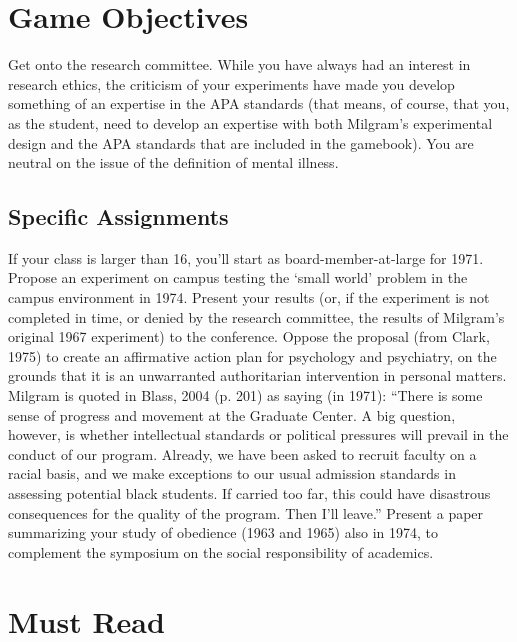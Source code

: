 \section{Game Objectives}
\label{gameobjectives}

Get onto the research committee. While you have always had an interest in research ethics, the criticism of your experiments have made you develop something of an expertise in the APA standards (that means, of course, that you, as the student, need to develop an expertise with both Milgram's experimental design and the APA standards that are included in the gamebook).
You are neutral on the issue of the definition of mental illness.

\subsection{Specific Assignments}
\label{specificassignments}

If your class is larger than 16, you'll start as board-member-at-large for 1971.
Propose an experiment on campus testing the `small world' problem in the campus environment in 1974. Present your results (or, if the experiment is not completed in time, or denied by the research committee, the results of Milgram's original 1967 experiment) to the conference.
Oppose the proposal (from Clark, 1975) to create an affirmative action plan for psychology and psychiatry, on the grounds that it is an unwarranted authoritarian intervention in personal matters. Milgram is quoted in Blass, 2004 (p. 201) as saying (in 1971):
 “There is some sense of progress and movement at the Graduate Center. A big question, however, is whether intellectual standards or political pressures will prevail in the conduct of our program. Already, we have been asked to recruit faculty on a racial basis, and we make exceptions to our usual admission standards in assessing potential black students. If carried too far, this could have disastrous consequences for the quality of the program. Then I'll leave.”
Present a paper summarizing your study of obedience (1963 and 1965) also in 1974, to complement the symposium on the social responsibility of academics.

\section{Must Read}
\label{mustread}

